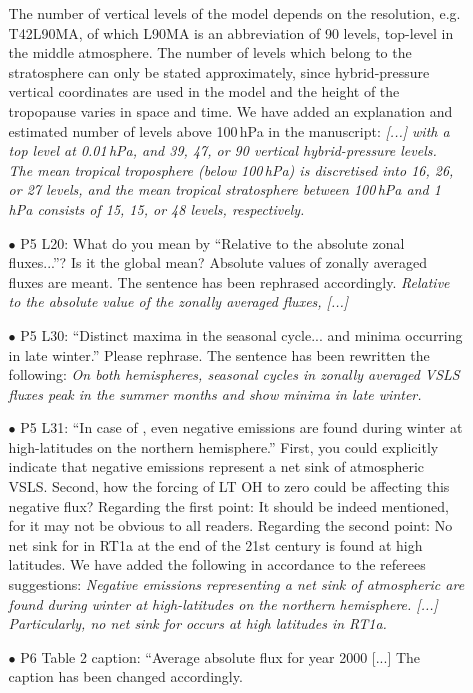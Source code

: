 \begin{itemize}
\begin{itemize}
The number of vertical levels of the model depends on the resolution, e.g. T42L90MA, of which L90MA is an abbreviation of 90 levels, top-level in the middle atmosphere. The number of levels which belong to the stratosphere can only be stated approximately, since hybrid-pressure vertical coordinates are used in the model and the height of the tropopause varies in space and time. We have added an explanation and estimated number of levels above 100\,\unit{hPa} in the manuscript: \emph{[...] with a top level at 0.01\,\unit{hPa}, and 39, 47, or 90 vertical hybrid-pressure levels. The mean tropical troposphere (below 100\,\unit{hPa}) is discretised into 16, 26, or 27 levels, and the mean tropical stratosphere between 100\,\unit{hPa} and 1\,\unit{hPa} consists of 15, 15, or 48 levels, respectively.}
\item[$\bullet$]{\color{blue}P5 L20: What do you mean by ``Relative to the absolute zonal fluxes...''? Is it the global mean?}
  Absolute values of zonally averaged fluxes are meant. The sentence has been rephrased accordingly. \emph{Relative to the absolute value of the zonally averaged fluxes, [...]}
\item[$\bullet$]{\color{blue}P5 L30: ``Distinct maxima in the seasonal cycle... and minima occurring in late winter.'' Please rephrase.}
  The sentence has been rewritten the following: \emph{On both hemispheres, seasonal cycles in zonally averaged VSLS fluxes peak in the summer months and show minima in late winter.}
\item[$\bullet$]{\color{blue}P5 L31: ``In case of , even negative emissions are found during winter at high-latitudes on the northern hemisphere.'' First, you could explicitly indicate that negative emissions represent a net sink of atmospheric VSLS. Second, how the forcing of LT OH to zero could be affecting this negative flux?}
  Regarding the first point: It should be indeed mentioned, for it may not be obvious to all readers. Regarding the second point: No net sink for  in RT1a at the end of the 21st century is found at high latitudes. We have added the following in accordance to the referees suggestions: \emph{Negative emissions representing a net sink of atmospheric  are found during winter at high-latitudes on the northern hemisphere. [...] Particularly, no net sink for  occurs at high latitudes in RT1a.}
\item[$\bullet$]{\color{blue}P6 Table 2 caption: ``Average absolute flux for year 2000 [...]}
  The caption has been changed accordingly.

\end{itemize}
\end{itemize}
